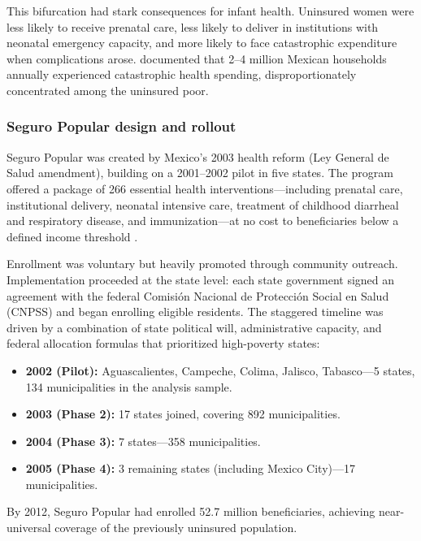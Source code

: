 \documentclass[12pt]{article}
\begin{document}
This bifurcation had stark consequences for infant health. Uninsured women were less likely to receive prenatal care, less likely to deliver in institutions with neonatal emergency capacity, and more likely to face catastrophic expenditure when complications arose. \citet{knaul2006} documented that 2--4 million Mexican households annually experienced catastrophic health spending, disproportionately concentrated among the uninsured poor.

\subsubsection*{Seguro Popular design and rollout} Seguro Popular was created by Mexico's 2003 health reform (Ley General de Salud amendment), building on a 2001--2002 pilot in five states. The program offered a package of 266 essential health interventions---including prenatal care, institutional delivery, neonatal intensive care, treatment of childhood diarrheal and respiratory disease, and immunization---at no cost to beneficiaries below a defined income threshold \citep{knaul2012}.

Enrollment was voluntary but heavily promoted through community outreach. Implementation proceeded at the state level: each state government signed an agreement with the federal Comisi\'{o}n Nacional de Protecci\'{o}n Social en Salud (CNPSS) and began enrolling eligible residents. The staggered timeline was driven by a combination of state political will, administrative capacity, and federal allocation formulas that prioritized high-poverty states:

\begin{itemize}
  \item \textbf{2002 (Pilot):} Aguascalientes, Campeche, Colima, Jalisco, Tabasco---5 states, 134 municipalities in the analysis sample.
  \item \textbf{2003 (Phase 2):} 17 states joined, covering 892 municipalities.
  \item \textbf{2004 (Phase 3):} 7 states---358 municipalities.
  \item \textbf{2005 (Phase 4):} 3 remaining states (including Mexico City)---17 municipalities.
\end{itemize}

By 2012, Seguro Popular had enrolled 52.7 million beneficiaries, achieving near-universal coverage of the previously uninsured population.
\end{document}
